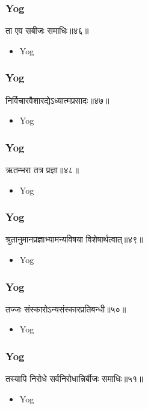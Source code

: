 \begin{frame}[fragile]\frametitle{Yog}
\begin{sanskrit}
ता एव सबीजः समाधिः॥४६॥
\end{sanskrit}
	\begin{itemize}
	\item Yog 
	\end{itemize}
\end{frame}


\begin{frame}[fragile]\frametitle{Yog}
\begin{sanskrit}
निर्विचारवैशारद्येऽध्यात्मप्रसादः॥४७॥
\end{sanskrit}
	\begin{itemize}
	\item Yog 
	\end{itemize}
\end{frame}




\begin{frame}[fragile]\frametitle{Yog}
\begin{sanskrit}
ऋतम्भरा तत्र प्रज्ञा॥४८॥
\end{sanskrit}
	\begin{itemize}
	\item Yog 
	\end{itemize}
\end{frame}



\begin{frame}[fragile]\frametitle{Yog}
\begin{sanskrit}
श्रुतानुमानप्रज्ञाभ्यामन्यविषया विशेषार्थत्वात्॥४९॥
\end{sanskrit}
	\begin{itemize}
	\item Yog 
	\end{itemize}
\end{frame}


\begin{frame}[fragile]\frametitle{Yog}
\begin{sanskrit}
तज्जः संस्कारोऽन्यसंस्कारप्रतिबन्धी॥५०॥
\end{sanskrit}
	\begin{itemize}
	\item Yog 
	\end{itemize}
\end{frame}


\begin{frame}[fragile]\frametitle{Yog}
\begin{sanskrit}
तस्यापि निरोधे सर्वनिरोधान्निर्बीजः समाधिः॥५१॥
\end{sanskrit}
	\begin{itemize}
	\item Yog 
	\end{itemize}
\end{frame}
